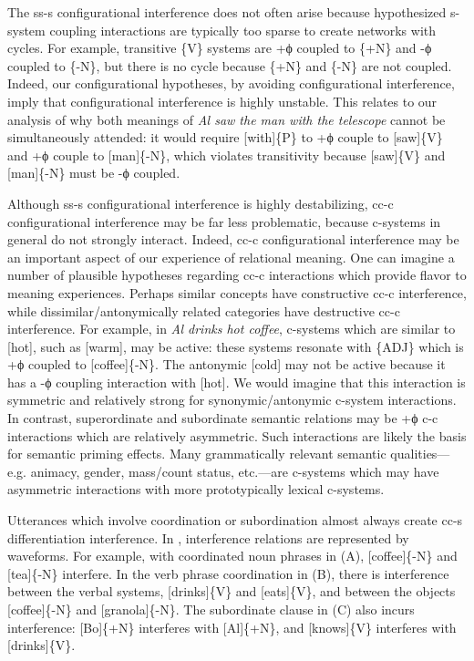   The ss-s configurational interference does not often arise because hypothesized s-system coupling interactions are typically too sparse to create networks with cycles. For example, transitive \{V\} systems are +ϕ coupled to \{+N\} and -ϕ coupled to \{-N\}, but there is no cycle because \{+N\} and \{-N\} are not coupled. Indeed, our configurational hypotheses, by avoiding configurational interference, imply that configurational interference is highly unstable. This relates to our analysis of why both meanings of \textit{Al saw the man with the telescope} cannot be simultaneously attended: it would require [with]\{P\} to +ϕ couple to [saw]\{V\} and +ϕ couple to [man]\{-N\}, which violates transitivity because [saw]\{V\} and [man]\{-N\} must be -ϕ coupled. 

  Although ss-s configurational interference is highly destabilizing, cc-c configurational interference may be far less problematic, because c-systems in general do not strongly interact. Indeed, cc-c configurational interference may be an important aspect of our experience of relational meaning. One can imagine a number of plausible hypotheses regarding cc-c interactions which provide flavor to meaning experiences. Perhaps similar concepts have constructive cc-c interference, while dissimilar/antonymically related categories have destructive cc-c interference. For example, in \textit{Al drinks hot coffee}, c-systems which are similar to [hot], such as [warm], may be active: these systems resonate with \{\textsc{ADJ}\} which is +ϕ coupled to [coffee]\{-N\}. The antonymic [cold] may not be active because it has a -ϕ coupling interaction with [hot]. We would imagine that this interaction is symmetric and relatively strong for synonymic/antonymic c-system interactions. In contrast, superordinate and subordinate semantic relations may be +ϕ c-c interactions which are relatively asymmetric. Such interactions are likely the basis for semantic priming effects. Many grammatically relevant semantic qualities—e.g. animacy, gender, mass/count status, etc.—are c-systems which may have asymmetric interactions with more prototypically lexical c-systems.

  Utterances which involve coordination or subordination almost always create cc-s differentiation interference. In {}, interference relations are represented by waveforms. For example, with coordinated noun phrases in (A), [coffee]\{-N\} and [tea]\{-N\} interfere. In the verb phrase coordination in (B), there is interference between the verbal systems, [drinks]\{V\} and [eats]\{V\}, and between the objects [coffee]\{-N\} and [granola]\{-N\}. The subordinate clause in (C) also incurs interference: [Bo]\{+N\} interferes with [Al]\{+N\}, and [knows]\{V\} interferes with [drinks]\{V\}.

